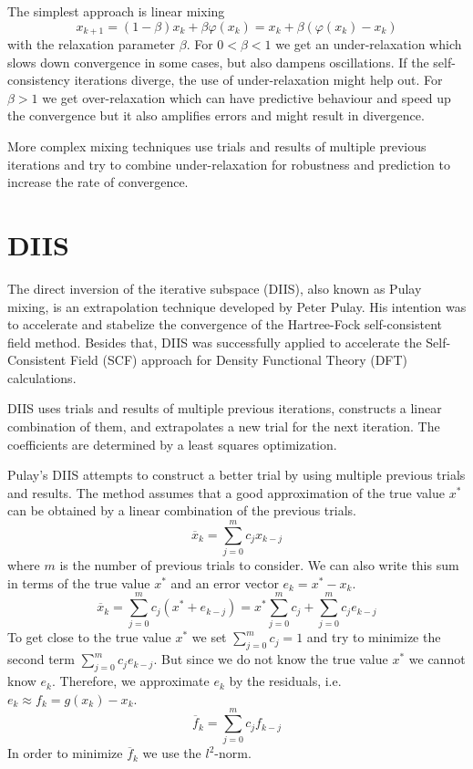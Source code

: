 The simplest approach is linear mixing
\begin{equation} \label{eq:linmix}
x_{k+1} = (1-\beta) x_k + \beta \varphi(x_k) = x_k + \beta (\varphi(x_k) - x_k)
\end{equation}
with the relaxation parameter \(\beta\).
For \(0 < \beta < 1\) we get an under-relaxation which slows down convergence in some cases, but also dampens oscillations. If the self-consistency iterations diverge, the use of under-relaxation might help out.
For \(\beta > 1\) we get over-relaxation which can have predictive behaviour and speed up the convergence but it also amplifies errors and might result in divergence.

More complex mixing techniques use trials and results of multiple previous iterations and try to combine under-relaxation for robustness and prediction to increase the rate of convergence.\cite{anderson_mixing}

\section{DIIS}
The direct inversion of the iterative subspace (DIIS), also known as Pulay mixing, is an extrapolation technique developed by Peter Pulay.\cite{diis_pulay1}\cite{diis_pulay2} His intention was to accelerate and stabelize the convergence of the Hartree-Fock self-consistent field method. Besides that, DIIS was successfully applied to accelerate the Self-Consistent Field (SCF) approach for Density Functional Theory (DFT) calculations.\cite{diis_restarted}

DIIS uses trials and results of multiple previous iterations, constructs a linear combination of them, and extrapolates a new trial for the next iteration. The coefficients are determined by a least squares optimization.

Pulay's DIIS attempts to construct a better trial by using multiple previous trials and results. The method assumes that a good approximation of the true value \(x^\ast\) can be obtained by a linear combination of the previous trials.
\begin{equation} \label{eq:diis_x}
\overline{x}_{k} = \sum_{j=0}^{m} c_j x_{k-j}
\end{equation}
where \(m\) is the number of previous trials to consider. We can also write this sum in terms of the true value \(x^\ast\) and an error vector \(e_{k} = x^\ast - x_{k}\).
\[\overline{x}_{k} = \sum_{j=0}^{m} c_j (x^\ast + e_{k-j}) = x^\ast \sum_{j=0}^{m} c_j + \sum_{j=0}^{m} c_j e_{k-j}\]
To get close to the true value \(x^\ast\) we set \(\sum_{j=0}^{m} c_j = 1\) and try to minimize the second term \(\sum_{j=0}^{m} c_j e_{k-j}\). But since we do not know the true value \(x^\ast\) we cannot know \(e_{k}\). Therefore, we approximate \(e_{k}\) by the residuals, i.e. \(e_{k} \approx f_{k} = g(x_k) - x_k\).
\[\overline{f}_{k} = \sum_{j=0}^{m} c_j f_{k-j}\]
In order to minimize \(\overline{f}_{k}\) we use the \(l^2\)-norm.

